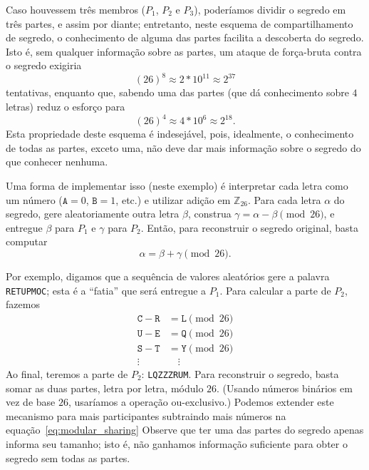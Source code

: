 \documentclass[10pt,twocolumn]{article}
\theoremstyle{definition}
\begin{document}
Caso houvessem três membros
($P_1$, $P_2$ e $P_3$),
poderíamos dividir o segredo em três partes,
e assim por diante;
entretanto,
neste esquema de compartilhamento de segredo,
o conhecimento de alguma das partes
facilita a descoberta do segredo.
Isto é,
sem qualquer informação sobre as partes,
um ataque de força-bruta contra o segredo
exigiria
\begin{equation*}
    (26)^8 \approx 2*10^{11} \approx 2^{37}
\end{equation*}
tentativas,
enquanto que, sabendo uma das partes
(que dá conhecimento sobre $4$ letras)
reduz o esforço para
\begin{equation*}
    (26)^4 \approx 4*10^{6} \approx 2^{18}.
\end{equation*}
Esta propriedade deste esquema é indesejável,
pois, idealmente,
o conhecimento de todas as partes, exceto uma,
não deve dar mais informação sobre o segredo
do que conhecer nenhuma.

Uma forma de implementar isso
(neste exemplo)
é interpretar cada letra como um número
($\mathtt A = 0$, $\mathtt B = 1$, etc.)
e utilizar adição em $\mathbb Z_{26}$.
Para cada letra $\alpha$ do segredo,
gere aleatoriamente outra letra $\beta$,
construa $\gamma = \alpha - \beta \pmod{26}$,
e entregue $\beta$ para $P_1$ e $\gamma$ para $P_2$.
Então,
para reconstruir o segredo original,
basta computar
\begin{equation}
    \alpha = \beta + \gamma \pmod{26}.
    \label{eq:modular_sharing}
\end{equation}

Por exemplo,
digamos que a sequência de valores aleatórios gere a palavra
\texttt{RETUPMOC};
esta é a ``fatia'' que será entregue a $P_1$.
Para calcular a parte de $P_2$,
fazemos
\begin{align*}
    \mathtt C - \mathtt R &= \mathtt L \pmod{26} \\
    \mathtt U - \mathtt E &= \mathtt Q \pmod{26} \\
    \mathtt S - \mathtt T &= \mathtt Y \pmod{26} \\
    \vdots \quad & \quad \vdots
\end{align*}
Ao final,
teremos a parte de $P_2$: \texttt{LQZZZRUM}.
Para reconstruir o segredo,
basta somar as duas partes,
letra por letra,
módulo $26$.
(Usando números binários em vez de base $26$,
usaríamos a operação ou-exclusivo.)
Podemos extender este mecanismo para mais participantes
subtraindo mais números na equação~\ref{eq:modular_sharing}
Observe que ter uma das partes do segredo
apenas informa seu tamanho;
isto é,
não ganhamos informação suficiente para obter o segredo
sem todas as partes.
\end{document}
